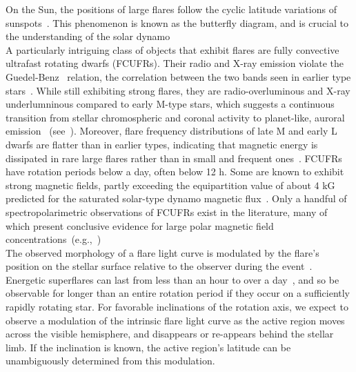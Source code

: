 \documentclass[fleqn,usenatbib,letters]{mnras}%
\begin{document}
On the Sun, the positions of large flares follow the cyclic latitude variations of sunspots~\citep{zhang2007}. This phenomenon is known as the butterfly diagram, and is crucial to the understanding of the solar dynamo~\citep{gnevyshev1977}%
\\
A particularly intriguing class of objects that exhibit flares are fully convective ultrafast rotating dwarfs (FCUFRs). Their radio and X-ray emission violate the Guedel-Benz~\citep{guedel1993, benz1994} relation, the correlation between the two bands seen in earlier type stars~\citep{berger2010, mclean2012, cook2014, williams2014}. While still exhibiting strong flares, they are radio-overluminous and X-ray underlumninous compared to early M-type stars, which suggests a continuous transition from stellar chromospheric and coronal activity to planet-like, auroral emission ~(see~\citealt{pineda2017}). Moreover, flare frequency distributions of late M and early L dwarfs are flatter than in earlier types, indicating that magnetic energy is dissipated in rare large flares rather than in small and frequent ones~\citep{paudel2018,deluca2020}. FCUFRs have rotation periods below a day, often below 12 h. Some are known to exhibit strong magnetic fields, partly exceeding the equipartition value of about 4 kG~\citep{shulyak2017} predicted for the saturated solar-type dynamo magnetic flux~\citep{pevtsov2003}. Only a handful of spectropolarimetric observations of FCUFRs exist in the literature, many of which present conclusive evidence for large polar magnetic field concentrations~(e.g.,~\citealt{barnes2015, barnes2017}) %
\\
The observed morphology of a flare light curve is modulated by the flare's position on the stellar surface relative to the observer during the event~\citep{tovmassian2003}. Energetic superflares can last from less than an hour to over a day~\citep{kowalski2013,paudel2018b}, and so be observable for longer than an entire rotation period if they occur on a sufficiently rapidly rotating star. For favorable inclinations of the rotation axis, we expect to observe a modulation of the intrinsic flare light curve as the active region moves across the visible hemisphere, and disappears or re-appears behind the stellar limb. If the inclination is known, the active region's latitude can be unambiguously determined from this modulation.
\end{document}
